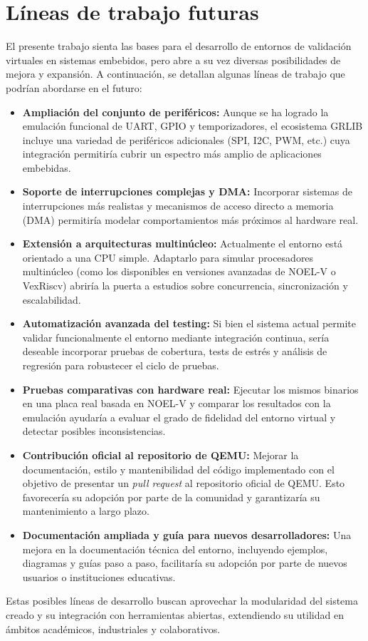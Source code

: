 \section{Líneas de trabajo futuras}
\label{sec:lineas-futuras}

El presente trabajo sienta las bases para el desarrollo de entornos de validación virtuales en sistemas embebidos, pero abre a su vez diversas posibilidades de mejora y expansión. A continuación, se detallan algunas líneas de trabajo que podrían abordarse en el futuro:

\begin{itemize}
    \item \textbf{Ampliación del conjunto de periféricos:} Aunque se ha logrado la emulación funcional de UART, GPIO y temporizadores, el ecosistema GRLIB incluye una variedad de periféricos adicionales (SPI, I2C, PWM, etc.) cuya integración permitiría cubrir un espectro más amplio de aplicaciones embebidas.

    \item \textbf{Soporte de interrupciones complejas y DMA:} Incorporar sistemas de interrupciones más realistas y mecanismos de acceso directo a memoria (DMA) permitiría modelar comportamientos más próximos al hardware real.

    \item \textbf{Extensión a arquitecturas multinúcleo:} Actualmente el entorno está orientado a una CPU simple. Adaptarlo para simular procesadores multinúcleo (como los disponibles en versiones avanzadas de NOEL-V o VexRiscv) abriría la puerta a estudios sobre concurrencia, sincronización y escalabilidad.

    \item \textbf{Automatización avanzada del testing:} Si bien el sistema actual permite validar funcionalmente el entorno mediante integración continua, sería deseable incorporar pruebas de cobertura, tests de estrés y análisis de regresión para robustecer el ciclo de pruebas.

    \item \textbf{Pruebas comparativas con hardware real:} Ejecutar los mismos binarios en una placa real basada en NOEL-V y comparar los resultados con la emulación ayudaría a evaluar el grado de fidelidad del entorno virtual y detectar posibles inconsistencias.

    \item \textbf{Contribución oficial al repositorio de QEMU:} Mejorar la documentación, estilo y mantenibilidad del código implementado con el objetivo de presentar un \emph{pull request} al repositorio oficial de QEMU. Esto favorecería su adopción por parte de la comunidad y garantizaría su mantenimiento a largo plazo.

    \item \textbf{Documentación ampliada y guía para nuevos desarrolladores:} Una mejora en la documentación técnica del entorno, incluyendo ejemplos, diagramas y guías paso a paso, facilitaría su adopción por parte de nuevos usuarios o instituciones educativas.
\end{itemize}

Estas posibles líneas de desarrollo buscan aprovechar la modularidad del sistema creado y su integración con herramientas abiertas, extendiendo su utilidad en ámbitos académicos, industriales y colaborativos.




